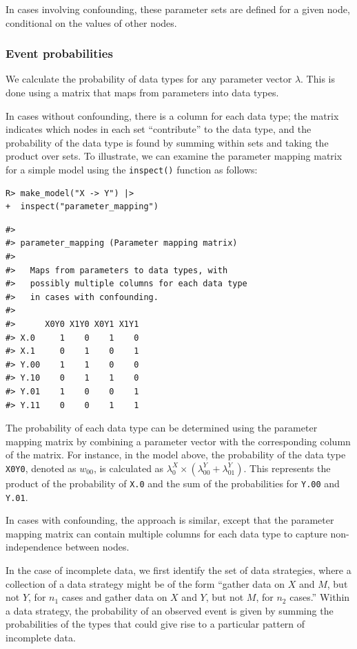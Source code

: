 \documentclass[
  11pt,
  article]{jss}
\begin{document}
In cases involving confounding, these parameter sets are defined for a
given node, conditional on the values of other nodes.

\subsubsection{Event probabilities}\label{event-probabilities}

We calculate the probability of data types for any parameter vector
\(\lambda\). This is done using a matrix that maps from parameters into
data types.

In cases without confounding, there is a column for each data type; the
matrix indicates which nodes in each set ``contribute'' to the data
type, and the probability of the data type is found by summing within
sets and taking the product over sets. To illustrate, we can examine the
parameter mapping matrix for a simple model using the \texttt{inspect()}
function as follows:

\begin{verbatim}
R> make_model("X -> Y") |> 
+  inspect("parameter_mapping") 
\end{verbatim}

\begin{verbatim}
#> 
#> parameter_mapping (Parameter mapping matrix) 
#> 
#>   Maps from parameters to data types, with
#>   possibly multiple columns for each data type
#>   in cases with confounding. 
#> 
#>      X0Y0 X1Y0 X0Y1 X1Y1
#> X.0     1    0    1    0
#> X.1     0    1    0    1
#> Y.00    1    1    0    0
#> Y.10    0    1    1    0
#> Y.01    1    0    0    1
#> Y.11    0    0    1    1
\end{verbatim}

The probability of each data type can be determined using the parameter
mapping matrix by combining a parameter vector with the corresponding
column of the matrix. For instance, in the model above, the probability
of the data type \texttt{X0Y0}, denoted as \(w_{00}\), is calculated as
\(\lambda^X_0 \times (\lambda^Y_{00} + \lambda^Y_{01})\). This
represents the product of the probability of \texttt{X.0} and the sum of
the probabilities for \texttt{Y.00} and \texttt{Y.01}.

In cases with confounding, the approach is similar, except that the
parameter mapping matrix can contain multiple columns for each data type
to capture non-independence between nodes.

In the case of incomplete data, we first identify the set of data
strategies, where a collection of a data strategy might be of the form
``gather data on \(X\) and \(M\), but not \(Y\), for \(n_1\) cases and
gather data on \(X\) and \(Y\), but not \(M\), for \(n_2\) cases.''
Within a data strategy, the probability of an observed event is given by
summing the probabilities of the types that could give rise to a
particular pattern of incomplete data.
\end{document}
